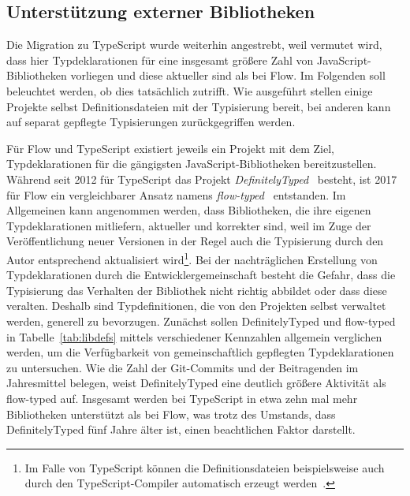 \subsection{Unterstützung externer Bibliotheken}

Die Migration zu TypeScript wurde weiterhin angestrebt, weil vermutet wird, dass hier Typdeklarationen für eine insgesamt größere Zahl von JavaScript-Bibliotheken vorliegen und diese aktueller sind als bei Flow. Im Folgenden soll beleuchtet werden, ob dies tatsächlich zutrifft. Wie ausgeführt stellen einige Projekte selbst Definitionsdateien mit der Typisierung bereit, bei anderen kann auf separat gepflegte Typisierungen zurückgegriffen werden.

Für Flow und TypeScript existiert jeweils ein Projekt mit dem Ziel, Typdeklarationen für die gängigsten JavaScript-Bibliotheken bereitzustellen. Während seit 2012 für TypeScript das Projekt \textit{DefinitelyTyped}~\autocite{DEFINITELY_TYPED} besteht, ist 2017 für Flow ein vergleichbarer Ansatz namens \textit{flow-typed}~\autocite{FLOW_TYPED} entstanden. Im Allgemeinen kann angenommen werden, dass Bibliotheken, die ihre eigenen Typdeklarationen mitliefern, aktueller und korrekter sind, weil im Zuge der Veröffentlichung neuer Versionen in der Regel auch die Typisierung durch den Autor entsprechend aktualisiert wird\footnote{Im Falle von TypeScript können die Definitionsdateien beispielsweise auch durch den TypeScript-Compiler automatisch erzeugt werden~\autocite{TSC:OPTIONS}.}. Bei der nachträglichen Erstellung von Typdeklarationen durch die Entwicklergemeinschaft besteht die Gefahr, dass die Typisierung das Verhalten der Bibliothek nicht richtig abbildet oder dass diese veralten. Deshalb sind Typdefinitionen, die von den Projekten selbst verwaltet werden, generell zu bevorzugen. Zunächst sollen DefinitelyTyped und flow-typed in Tabelle~\ref{tab:libdefs} mittels verschiedener Kennzahlen allgemein verglichen werden, um die Verfügbarkeit von gemeinschaftlich gepflegten Typdeklarationen zu untersuchen. Wie die Zahl der Git-Commits und der Beitragenden im Jahresmittel belegen, weist DefinitelyTyped eine deutlich größere Aktivität als flow-typed auf. Insgesamt werden bei TypeScript in etwa zehn mal mehr Bibliotheken unterstützt als bei Flow, was trotz des Umstands, dass DefinitelyTyped fünf Jahre älter ist, einen beachtlichen Faktor darstellt.

\tablespace


